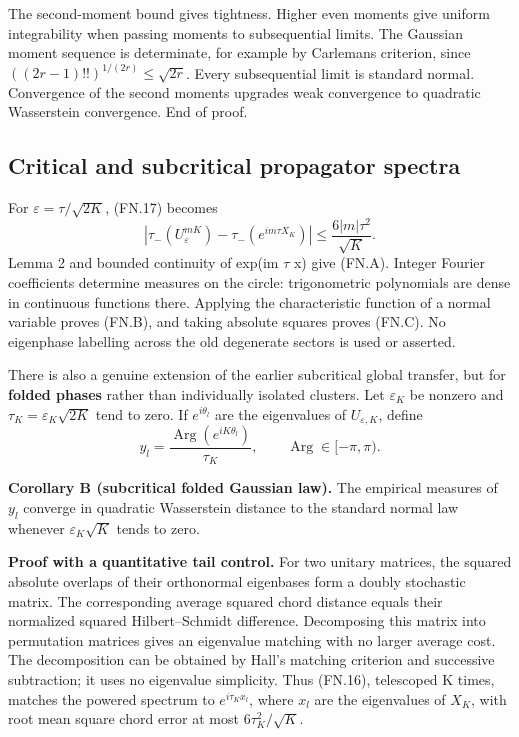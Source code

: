 The second-moment bound gives tightness. Higher even moments give uniform integrability when passing moments to subsequential limits. The Gaussian moment sequence is determinate, for example by Carleman\textquotesingle s criterion, since \(((2r-1)!!)^{1/(2r)}\leq\sqrt{2r}\). Every subsequential limit is standard normal. Convergence of the second moments upgrades weak convergence to quadratic Wasserstein convergence. End of proof.

\subsection{Critical and subcritical propagator spectra}\label{floquet:critical-and-subcritical-propagator-spectra}

For \(\varepsilon=\tau/\sqrt{2K}\), (FN.17) becomes \[
 \left|\tau_-(U_\varepsilon^{mK})-
              \tau_-(e^{im\tau X_K})\right|
       \leq \frac{6|m|\tau^2}{\sqrt K}.                        \tag{FN.21}
\] Lemma 2 and bounded continuity of exp(im \(\tau\) x) give (FN.A). Integer Fourier coefficients determine measures on the circle: trigonometric polynomials are dense in continuous functions there. Applying the characteristic function of a normal variable proves (FN.B), and taking absolute squares proves (FN.C). No eigenphase labelling across the old degenerate sectors is used or asserted.

There is also a genuine extension of the earlier subcritical global transfer, but for \textbf{folded phases} rather than individually isolated clusters. Let \(\varepsilon_{K}\) be nonzero and \(\tau_K=\varepsilon_K\sqrt{2K}\) tend to zero. If \(e^{i\theta_l}\) are the eigenvalues of \(U_{\varepsilon,K}\), define \[
 y_l=\frac{\operatorname{Arg}(e^{iK\theta_l})}{\tau_K},
 \qquad \operatorname{Arg}\in[-\pi,\pi).
\]

\textbf{Corollary B (subcritical folded Gaussian law).} The empirical measures of \(y_{l}\) converge in quadratic Wasserstein distance to the standard normal law whenever \(\varepsilon_K\sqrt K\) tends to zero.

\textbf{Proof with a quantitative tail control.} For two unitary matrices, the squared absolute overlaps of their orthonormal eigenbases form a doubly stochastic matrix. The corresponding average squared chord distance equals their normalized squared Hilbert--Schmidt difference. Decomposing this matrix into permutation matrices gives an eigenvalue matching with no larger average cost. The decomposition can be obtained by Hall's matching criterion and successive subtraction; it uses no eigenvalue simplicity. Thus (FN.16), telescoped K times, matches the powered spectrum to \(e^{i\tau_Kx_l}\), where \(x_{l}\) are the eigenvalues of \(X_{K}\), with root mean square chord error at most \(6\tau_K^2/\sqrt K\).

